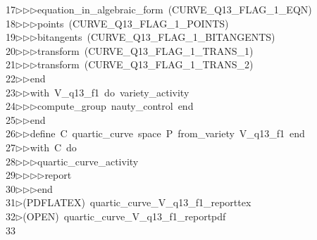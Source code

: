 \begin{tabbing}
17\>$\triangleright$\>$\triangleright$\>$\triangleright$\>equation\_in\_algebraic\_form\ (CURVE\_Q13\_FLAG\_1\_EQN)\ \\[0pt]
18\>$\triangleright$\>$\triangleright$\>$\triangleright$\>points\ (CURVE\_Q13\_FLAG\_1\_POINTS)\ \\[0pt]
19\>$\triangleright$\>$\triangleright$\>$\triangleright$\>bitangents\ (CURVE\_Q13\_FLAG\_1\_BITANGENTS)\ \\[0pt]
20\>$\triangleright$\>$\triangleright$\>$\triangleright$\>transform\ (CURVE\_Q13\_FLAG\_1\_TRANS\_1)\ \\[0pt]
21\>$\triangleright$\>$\triangleright$\>$\triangleright$\>transform\ (CURVE\_Q13\_FLAG\_1\_TRANS\_2)\ \\[0pt]
22\>$\triangleright$\>$\triangleright$\>end\ \\[0pt]
23\>$\triangleright$\>$\triangleright$\>with\ V\_q13\_f1\ do\ variety\_activity\ \\[0pt]
24\>$\triangleright$\>$\triangleright$\>$\triangleright$\>compute\_group\ nauty\_control\ end\ \\[0pt]
25\>$\triangleright$\>$\triangleright$\>end\ \\[0pt]
26\>$\triangleright$\>$\triangleright$\>define\ C\ quartic\_curve\ space\ P\ from\_variety\ V\_q13\_f1\ end\ \\[0pt]
27\>$\triangleright$\>$\triangleright$\>with\ C\ do\ \\[0pt]
28\>$\triangleright$\>$\triangleright$\>$\triangleright$\>quartic\_curve\_activity\ \\[0pt]
29\>$\triangleright$\>$\triangleright$\>$\triangleright$\>$\triangleright$\>report\ \\[0pt]
30\>$\triangleright$\>$\triangleright$\>$\triangleright$\>end\\[0pt]
31\>$\triangleright$\>(PDFLATEX)\ quartic\_curve\_V\_q13\_f1\_reporttex\\[0pt]
32\>$\triangleright$\>(OPEN)\ quartic\_curve\_V\_q13\_f1\_reportpdf\\[0pt]
33\>\end{tabbing}
